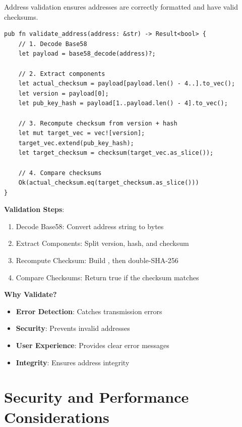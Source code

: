 Address validation ensures addresses are correctly formatted and have valid checksums.

\begin{listing}[htbp]
\caption{Address validation with checksum verification}
\label{lst:ch08-address-validate}
\begin{verbatim}
pub fn validate_address(address: &str) -> Result<bool> {
    // 1. Decode Base58
    let payload = base58_decode(address)?;

    // 2. Extract components
    let actual_checksum = payload[payload.len() - 4..].to_vec();
    let version = payload[0];
    let pub_key_hash = payload[1..payload.len() - 4].to_vec();

    // 3. Recompute checksum from version + hash
    let mut target_vec = vec![version];
    target_vec.extend(pub_key_hash);
    let target_checksum = checksum(target_vec.as_slice());

    // 4. Compare checksums
    Ok(actual_checksum.eq(target_checksum.as_slice()))
}
\end{verbatim}
\end{listing}

\textbf{Validation Steps}:
\begin{enumerate}
  \item Decode Base58: Convert address string to bytes
  \item Extract Components: Split version, hash, and checksum
  \item Recompute Checksum: Build , then double-SHA-256
  \item Compare Checksums: Return true if the checksum matches
\end{enumerate}

\textbf{Why Validate?}
\begin{itemize}
  \item \textbf{Error Detection}: Catches transmission errors
  \item \textbf{Security}: Prevents invalid addresses
  \item \textbf{User Experience}: Provides clear error messages
  \item \textbf{Integrity}: Ensures address integrity
\end{itemize}

\section{Security and Performance Considerations}
\label{sec:ch08-security-performance}

